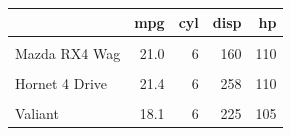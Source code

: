 \documentclass{article}
\begin{document}
\thispagestyle{empty}

\begin{table}
\centering
\begin{tabular}{lrrrr}
\toprule
\textbf{ } & \textbf{mpg} & \textbf{cyl} & \textbf{disp} & \textbf{hp}\\
\midrule
\cellcolor{nejmshade}{Mazda RX4} & \cellcolor{nejmshade}{21.0} & \cellcolor{nejmshade}{6} & \cellcolor{nejmshade}{160} & \cellcolor{nejmshade}{110}\\
Mazda RX4 Wag & 21.0 & 6 & 160 & 110\\
\cellcolor{nejmshade}{Datsun 710} & \cellcolor{nejmshade}{22.8} & \cellcolor{nejmshade}{4} & \cellcolor{nejmshade}{108} & \cellcolor{nejmshade}{93}\\
Hornet 4 Drive & 21.4 & 6 & 258 & 110\\
\cellcolor{nejmshade}{Hornet Sportabout} & \cellcolor{nejmshade}{18.7} & \cellcolor{nejmshade}{8} & \cellcolor{nejmshade}{360} & \cellcolor{nejmshade}{175}\\
\addlinespace
Valiant & 18.1 & 6 & 225 & 105\\
\bottomrule
\end{tabular}
\end{table}
\end{document}
